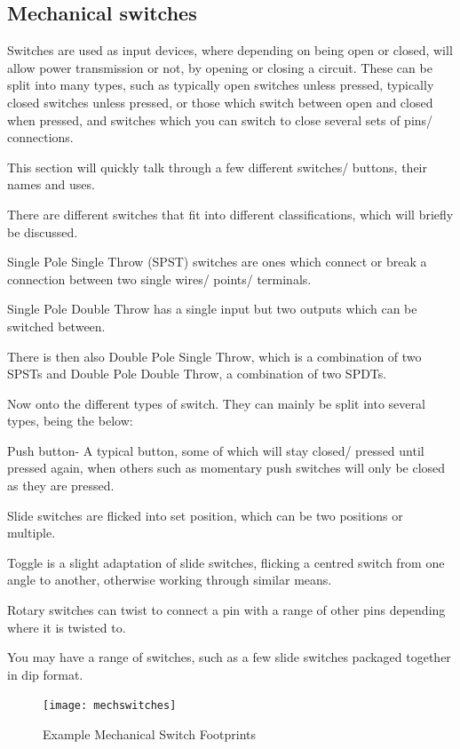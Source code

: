 \documentclass[a4paper,11pt]{report}
\begin{document}
\vspace*{1\baselineskip}

\subsection{Mechanical switches}

Switches are used as input devices, where depending on being open or closed, will allow power transmission or not, by opening or closing a circuit. These can be split into many types, such as typically open switches unless pressed, typically closed switches unless pressed, or those which switch between open and closed when pressed, and switches which you can switch to close several sets of pins/ connections.

This section will quickly talk through a few different switches/ buttons, their names and uses.

There are different switches that fit into different classifications, which will briefly be discussed.

Single Pole Single Throw (SPST) switches are ones which connect or break a connection between two single wires/ points/ terminals.

Single Pole Double Throw has a single input but two outputs which can be switched between.

There is then also Double Pole Single Throw, which is a combination of two SPSTs and Double Pole Double Throw, a combination of two SPDTs.

Now onto the different types of switch. They can mainly be split into several types, being the below:

Push button- A typical button, some of which will stay closed/ pressed until pressed again, when others such as momentary push switches will only be closed as they are pressed.

Slide switches are flicked into set position, which can be two positions or multiple.

Toggle is a slight adaptation of slide switches, flicking a centred switch from one angle to another, otherwise working through similar means.

Rotary switches can twist to connect a pin with a range of other pins depending where it is twisted to.

You may have a range of switches, such as a few slide switches packaged together in \gls{dip} format.

\begin{figure}[H]
\centering
\texttt{[image: mechswitches]}
\caption{Example Mechanical Switch Footprints}
\end{figure}
\end{document}
